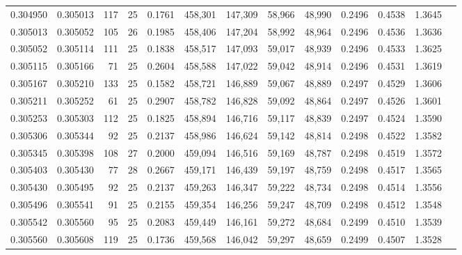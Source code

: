 \begin{tabular}{rrrrrrrrrrrrr}
0.304950 & 0.305013 &   117 &  25 &                                     0.1761 & 458,301 & 147,309 &  58,966 &  48,990 & 0.2496 & 0.4538 & 1.3645 \\
0.305013 & 0.305052 &   105 &  26 &                                     0.1985 & 458,406 & 147,204 &  58,992 &  48,964 & 0.2496 & 0.4536 & 1.3636 \\
0.305052 & 0.305114 &   111 &  25 &                                     0.1838 & 458,517 & 147,093 &  59,017 &  48,939 & 0.2496 & 0.4533 & 1.3625 \\
0.305115 & 0.305166 &    71 &  25 &                                     0.2604 & 458,588 & 147,022 &  59,042 &  48,914 & 0.2496 & 0.4531 & 1.3619 \\
0.305167 & 0.305210 &   133 &  25 &                                     0.1582 & 458,721 & 146,889 &  59,067 &  48,889 & 0.2497 & 0.4529 & 1.3606 \\
0.305211 & 0.305252 &    61 &  25 &                                     0.2907 & 458,782 & 146,828 &  59,092 &  48,864 & 0.2497 & 0.4526 & 1.3601 \\
0.305253 & 0.305303 &   112 &  25 &                                     0.1825 & 458,894 & 146,716 &  59,117 &  48,839 & 0.2497 & 0.4524 & 1.3590 \\
0.305306 & 0.305344 &    92 &  25 &                                     0.2137 & 458,986 & 146,624 &  59,142 &  48,814 & 0.2498 & 0.4522 & 1.3582 \\
0.305345 & 0.305398 &   108 &  27 &                                     0.2000 & 459,094 & 146,516 &  59,169 &  48,787 & 0.2498 & 0.4519 & 1.3572 \\
0.305403 & 0.305430 &    77 &  28 &                                     0.2667 & 459,171 & 146,439 &  59,197 &  48,759 & 0.2498 & 0.4517 & 1.3565 \\
0.305430 & 0.305495 &    92 &  25 &                                     0.2137 & 459,263 & 146,347 &  59,222 &  48,734 & 0.2498 & 0.4514 & 1.3556 \\
0.305496 & 0.305541 &    91 &  25 &                                     0.2155 & 459,354 & 146,256 &  59,247 &  48,709 & 0.2498 & 0.4512 & 1.3548 \\
0.305542 & 0.305560 &    95 &  25 &                                     0.2083 & 459,449 & 146,161 &  59,272 &  48,684 & 0.2499 & 0.4510 & 1.3539 \\
0.305560 & 0.305608 &   119 &  25 &                                     0.1736 & 459,568 & 146,042 &  59,297 &  48,659 & 0.2499 & 0.4507 & 1.3528 \\

\end{tabular}
